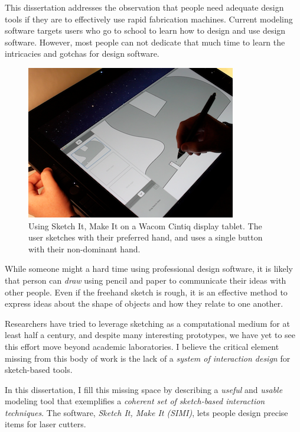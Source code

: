 This dissertation addresses the observation that people need adequate
design tools if they are to effectively use rapid fabrication
machines. Current modeling software targets users who go to school to
learn how to design and use design software. However, most people can
not dedicate that much time to learn the intricacies and gotchas for
design software.

\begin{figure}[t]
  \centering
  \includegraphics[width=0.9\linewidth]{img/simi-with-cintiq.png}
  \caption[SIMI on a Wacom Cintiq]{Using Sketch It, Make It on a Wacom
    Cintiq display tablet. The user sketches with their preferred
    hand, and uses a single button with their non-dominant hand.}
  \label{fig:simi-intro}
\end{figure}

While someone might a hard time using professional design software, it
is likely that person can \textit{draw} using pencil and paper to
communicate their ideas with other people. Even if the freehand sketch
is rough, it is an effective method to express ideas about the shape
of objects and how they relate to one another.

Researchers have tried to leverage sketching as a computational medium
for at least half a century, and despite many interesting prototypes,
we have yet to see this effort move beyond academic laboratories. I
believe the critical element missing from this body of work is the
lack of a \textit{system of interaction design} for sketch-based
tools.

In this dissertation, I fill this missing space by describing a
\textit{useful} and \textit{usable} modeling tool that exemplifies a
\textit{coherent set of sketch-based interaction techniques}. The
software, \textit{Sketch It, Make It (SIMI)}, lets people design
precise items for laser cutters. 

